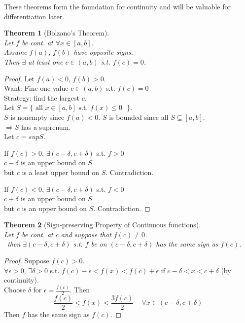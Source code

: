 \documentclass[twoside]{amsart}
\theoremstyle{plain}
\newtheorem{theorem}{Theorem}
\theoremstyle{definition}
\begin{document}
These theorems form the foundation for continuity and will be valuable for differentiation later.  

\begin{theorem}[Bolzano's Theorem]  \quad \\
Let $f$ be cont. at $\forall x \in [a,b]$.  \\
Assume $f(a), \, f(b)$ have opposite signs.   \\
Then $\exists$ at least one $c \in (a,b)$ s.t. $f(c) =0$.  
\end{theorem} 

\begin{proof}
  Let $f(a) < 0 , \, f(b) > 0 $.  \\
  Want: Fine one value $c \in (a,b)$ s.t. $f(c)=0$ \\
  Strategy: find the largest $c$.  \\
  Let $S = \{ \text{ all $x \in [a,b]$ s.t. $f(x) \leq 0$ } \}$. \\
$S$ is nonempty since $f(a) < 0$.  $S$ is bounded since all $S \subseteq [a,b]$.  \\
  $\Longrightarrow S$ has a suprenum.  \\
Let $c = sup S$.  

If $f(c) > 0, \, \exists (c-\delta, c+\delta)$ s.t. $f>0$ \\
\phantom{ If } $c-\delta$ is an upper bound on $S$ \\
\phantom{ If c-d } but $c$ is a least upper bound on $S$.  Contradiction.  

If $f(c) < 0 , \, \exists (c-\delta, c+ \delta)$ s.t. $f<0$ \\
\phantom{ if } $c + \delta$ is an upper bound on $S$ \\
\phantom{ if c-d } but $c$ is an upper bound on $S$.  Contradiction.  
\end{proof}

\begin{theorem}[Sign-preserving Property of Continuous functions] \quad \\
Let $f$ be cont. at $c$ and suppose that $f(c) \neq 0$.  \\\
\quad \quad then $\exists (c-\delta, c+\delta)$ s.t. $f$ be on $(c-\delta, c+\delta)$ has the same sign as $f(c)$.  
\end{theorem}

\begin{proof}
  Suppose $f(c) >0$.   \\
  $\forall \epsilon > 0, \, \exists \delta > 0 $ s.t. $f(c) - \epsilon < f(x) < f(c) + \epsilon$ if $c-\delta < x < c+\delta$ (by continuity).  \\
  Choose $\delta$ for $\epsilon = \frac{f(c)}{2}$.  Then 
\[
\frac{f(c)}{2} < f(x) < \frac{3f(c)}{2} \quad \, \forall x \in (c-\delta, c+\delta)
\]
Then $f$ has the same sign as $f(c)$.  
\end{proof}
\end{document}
